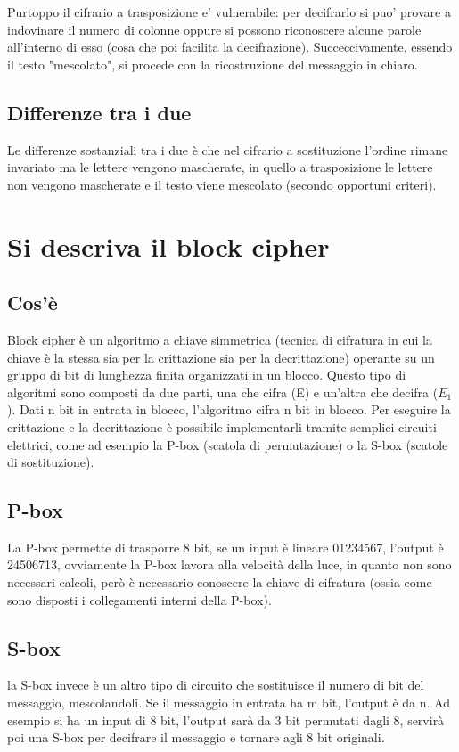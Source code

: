 Purtoppo il cifrario a trasposizione e' vulnerabile: per decifrarlo si puo' provare a indovinare il numero di colonne oppure si possono riconoscere alcune parole all'interno di esso (cosa che poi facilita la decifrazione). Succeccivamente, essendo il testo "mescolato", si procede con la ricostruzione del messaggio in chiaro.

\subsection{Differenze tra i due}
Le differenze sostanziali tra i due è che nel cifrario a sostituzione l'ordine rimane invariato ma le lettere vengono mascherate, in quello a trasposizione le lettere non vengono mascherate e il testo viene mescolato (secondo opportuni criteri).

\section{Si descriva il block cipher}
\subsection{Cos'è}
Block cipher è un algoritmo a chiave simmetrica (tecnica di cifratura in cui la chiave è la stessa sia per la crittazione sia per la decrittazione) operante su un gruppo di bit di lunghezza finita organizzati in un blocco.
Questo tipo di algoritmi sono composti da due parti, una che cifra (E) e un'altra che decifra ($E_1$).
Dati n bit in entrata in blocco, l'algoritmo cifra n bit in blocco.
Per eseguire la crittazione e la decrittazione è possibile implementarli tramite semplici circuiti elettrici, come ad esempio la P-box (scatola di permutazione) o la S-box (scatole di sostituzione).
\subsection{P-box}
La P-box permette di trasporre 8 bit, se un input è lineare 01234567, l'output è 24506713, ovviamente la P-box lavora alla velocità della luce, in quanto non sono necessari calcoli, però è necessario conoscere la chiave di cifratura (ossia come sono disposti i collegamenti interni della P-box).
\subsection{S-box}
la S-box invece è un altro tipo di circuito che sostituisce il numero di bit del messaggio, mescolandoli.
Se il messaggio in entrata ha m bit, l'output è da n. Ad esempio si ha un input di 8 bit, l'output sarà da 3 bit permutati dagli 8, servirà poi una S-box per decifrare il messaggio e tornare agli 8 bit originali. 


